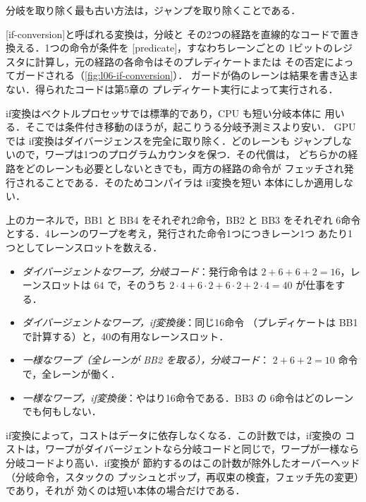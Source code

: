 \documentclass[../main.tex]{subfiles}
\begin{document}
分岐を取り除く最も古い方法は，ジャンプを取り除くことである．

\begin{definition}[if変換]
  \label{def:l06-if-conversion}
  [if-conversion]と呼ばれる変換は，分岐と
  その2つの経路を直線的なコードで置き換える．1つの命令が条件を
  [predicate]，すなわちレーンごとの
  1ビットのレジスタに計算し，元の経路の各命令はそのプレディケートまたは
  その否定によってガードされる（\cref{fig:l06-if-conversion}）．
  ガードが偽のレーンは結果を書き込まない．得られたコードは第5章の
  プレディケート実行によって実行される．
\end{definition}

\begin{marginfigure}
  \resizebox{\linewidth}{!}{}
  \caption{if変換後の\cref{fig:l06-divergent-cfg}の分岐．
    ガード付きの命令を全レーンがフェッチする1つの基本ブロック．}
  \label{fig:l06-if-conversion}
\end{marginfigure}

if変換はベクトルプロセッサでは標準的であり，CPU も短い分岐本体に
用いる．そこでは条件付き移動のほうが，起こりうる分岐予測ミスより安い．
GPU では if変換はダイバージェンスを完全に取り除く．どのレーンも
ジャンプしないので，ワープは1つのプログラムカウンタを保つ．その代償は，
どちらかの経路をどのレーンも必要としないときでも，両方の経路の命令が
フェッチされ発行されることである．そのためコンパイラは if変換を短い
本体にしか適用しない．

\begin{example}
  \label{ex:l06-if-conversion}
  上のカーネルで，BB1 と BB4 をそれぞれ2命令，BB2 と BB3 をそれぞれ
  6命令とする．4レーンのワープを考え，発行された命令1つにつきレーン1つ
  あたり1つとしてレーンスロットを数える．
  \begin{itemize}
    \item \emph{ダイバージェントなワープ，分岐コード}：発行命令は
      $2+6+6+2 = 16$，レーンスロットは $64$ で，そのうち $2\cdot4 + 6\cdot2 +
      6\cdot2 + 2\cdot4 = 40$ が仕事をする．
    \item \emph{ダイバージェントなワープ，if変換後}：同じ16命令
      （プレディケートは BB1 で計算する）と，40の有用なレーンスロット．
    \item \emph{一様なワープ（全レーンが BB2 を取る），分岐コード}：
      $2+6+2 = 10$ 命令で，全レーンが働く．
    \item \emph{一様なワープ，if変換後}：やはり16命令である．BB3 の
      6命令はどのレーンでも何もしない．
  \end{itemize}
  if変換によって，コストはデータに依存しなくなる．この計数では，if変換の
  コストは，ワープがダイバージェントなら分岐コードと同じで，ワープが一様なら
  分岐コードより高い．if変換が
  節約するのはこの計数が除外したオーバーヘッド（分岐命令，スタックの
  プッシュとポップ，再収束の検査，フェッチ先の変更）であり，それが
  効くのは短い本体の場合だけである．
\end{example}
\end{document}
